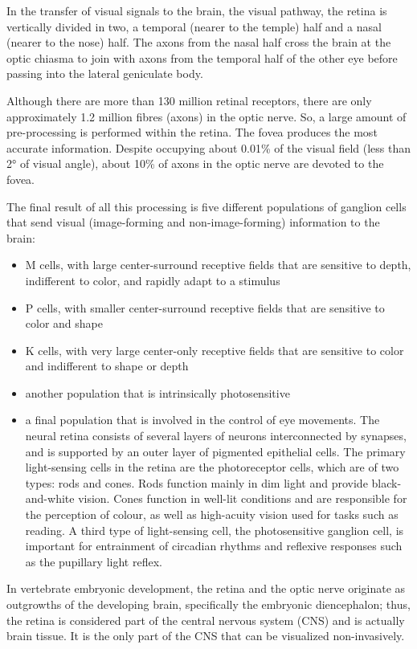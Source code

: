 In the transfer of visual signals to the brain, the visual pathway, the retina is vertically divided in two, a temporal (nearer to the temple) half and a nasal (nearer to the nose) half. The axons from the nasal half cross the brain at the optic chiasma to join with axons from the temporal half of the other eye before passing into the lateral geniculate body.

Although there are more than 130 million retinal receptors, there are only approximately 1.2 million fibres (axons) in the optic nerve. So, a large amount of pre-processing is performed within the retina. The fovea produces the most accurate information. Despite occupying about 0.01\% of the visual field (less than 2° of visual angle), about 10\% of axons in the optic nerve are devoted to the fovea.

The final result of all this processing is five different populations of ganglion cells that send visual (image-forming and non-image-forming) information to the brain:

\begin{itemize}
\tightlist
\item
  M cells, with large center-surround receptive fields that are sensitive to depth, indifferent to color, and rapidly adapt to a stimulus
\item
  P cells, with smaller center-surround receptive fields that are sensitive to color and shape
\item
  K cells, with very large center-only receptive fields that are sensitive to color and indifferent to shape or depth
\item
  another population that is intrinsically photosensitive
\item
  a final population that is involved in the control of eye movements.
  The neural retina consists of several layers of neurons interconnected by synapses, and is supported by an outer layer of pigmented epithelial cells. The primary light-sensing cells in the retina are the photoreceptor cells, which are of two types: rods and cones. Rods function mainly in dim light and provide black-and-white vision. Cones function in well-lit conditions and are responsible for the perception of colour, as well as high-acuity vision used for tasks such as reading. A third type of light-sensing cell, the photosensitive ganglion cell, is important for entrainment of circadian rhythms and reflexive responses such as the pupillary light reflex.
\end{itemize}

In vertebrate embryonic development, the retina and the optic nerve originate as outgrowths of the developing brain, specifically the embryonic diencephalon; thus, the retina is considered part of the central nervous system (CNS) and is actually brain tissue. It is the only part of the CNS that can be visualized non-invasively.

